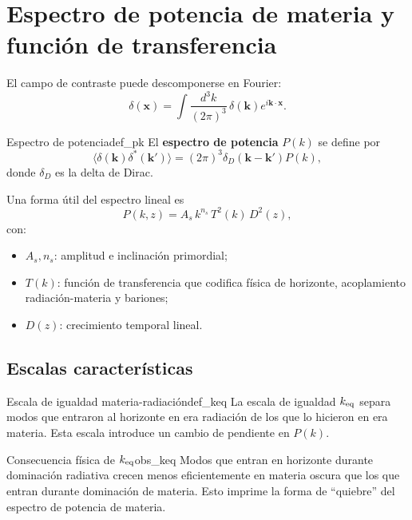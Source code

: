 \section{Espectro de potencia de materia y función de transferencia}
\label{sec:pk_transfer}

El campo de contraste puede descomponerse en Fourier:
\begin{equation}
\delta(\mathbf{x})=\int\frac{d^3k}{(2\pi)^3}\,\delta(\mathbf{k})e^{i\mathbf{k}\cdot\mathbf{x}}.
\end{equation}

\begin{definicion}{Espectro de potencia}{def_pk}
El \textbf{espectro de potencia} $P(k)$ se define por
\begin{equation}
\langle \delta(\mathbf{k})\delta^\ast(\mathbf{k}')\rangle=(2\pi)^3\delta_D(\mathbf{k}-\mathbf{k}')P(k),
\end{equation}
donde $\delta_D$ es la delta de Dirac.
\end{definicion}

Una forma útil del espectro lineal es
\begin{equation}
P(k,z)=A_s\,k^{n_s}\,T^2(k)\,D^2(z),
\label{eq:pk_factorized}
\end{equation}
con:
\begin{itemize}[leftmargin=2em]
  \item $A_s, n_s$: amplitud e inclinación primordial;
  \item $T(k)$: función de transferencia que codifica física de horizonte, acoplamiento radiación-materia y bariones;
  \item $D(z)$: crecimiento temporal lineal.
\end{itemize}

\subsection{Escalas características}

\begin{definicion}{Escala de igualdad materia-radiación}{def_keq}
La escala de igualdad $k_{\rm eq}$ separa modos que entraron al horizonte en era radiación de los que lo hicieron en era materia. Esta escala introduce un cambio de pendiente en $P(k)$.
\end{definicion}

\begin{observacion}{Consecuencia física de $k_{\rm eq}$}{obs_keq}
Modos que entran en horizonte durante dominación radiativa crecen menos eficientemente en materia oscura que los que entran durante dominación de materia. Esto imprime la forma de ``quiebre'' del espectro de potencia de materia.
\end{observacion}

